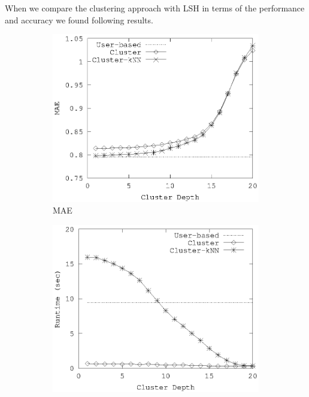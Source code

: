 \documentclass[conference]{IEEEtran}
\begin{document}
When we compare the clustering approach with LSH in terms of the performance 
and accuracy we found following results.

\begin{figure}[!h]
        \begin{subfigure}[b]{0.225\textwidth}
                \includegraphics[width=\textwidth]{charts/cl-mae.eps}
                \caption{MAE}
                \label{fig:cl-mae}
        \end{subfigure}
        \quad
        \begin{subfigure}[b]{0.225\textwidth}
                \includegraphics[width=\textwidth]{charts/cl-runtime.eps}

\end{subfigure}
\end{figure}
\end{document}
